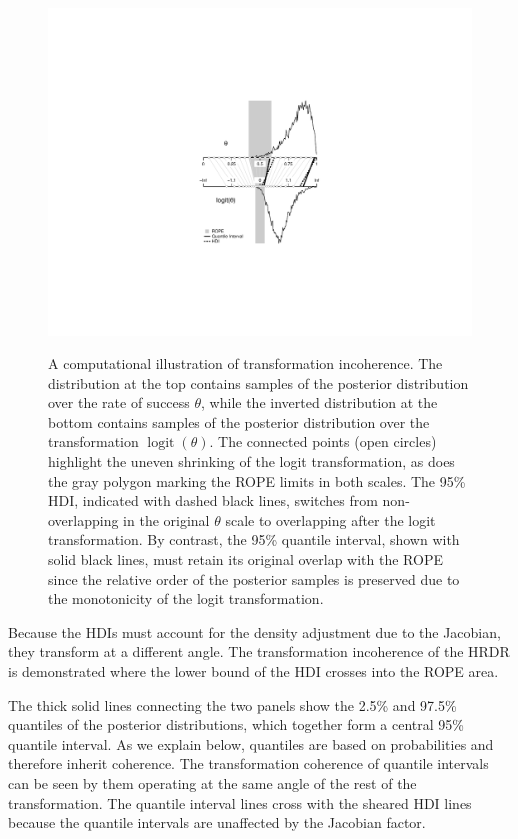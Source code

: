 \documentclass[9pt,twocolumn,twoside]{cidlab-draft}\templatetype{cidlab-invited}
\newcommand{\hdr}{HRDR}
\DeclareMathOperator*{\logit}{logit}
\begin{document}
\begin{figure}
    \centering
    {\includegraphics[bb=285 170 510 450,scale=.9]{p/figure3.pdf}}
    \caption{A computational illustration of transformation incoherence.  The distribution at the top contains samples of the posterior distribution over the rate of success $\theta$, while the inverted distribution at the bottom contains samples of the posterior distribution over the transformation $\logit(\theta)$. The connected points (open circles) highlight the uneven shrinking of the logit transformation, as does the gray polygon marking the ROPE limits in both scales.
    The 95\% HDI, indicated with dashed black lines, switches from non-overlapping in the original $\theta$ scale to overlapping after the logit transformation.
    By contrast, the 95\% quantile interval, shown with solid black lines, must retain its original overlap with the ROPE since the relative order of the posterior samples is preserved due to the monotonicity of the logit transformation.}
    \label{fig:transformation}
\end{figure}

Because the HDIs must account for the density adjustment due to the Jacobian, they transform at a different angle. The transformation incoherence of the \hdr{} is demonstrated where the lower bound of the HDI crosses into the ROPE area. 

The thick solid lines connecting the two panels show the 2.5\% and 97.5\% quantiles of the posterior distributions, which together form a central 95\% quantile interval. As we explain below, quantiles are based on probabilities and therefore inherit coherence. The transformation coherence of quantile intervals can be seen by them operating at the same angle of the rest of the transformation. The quantile interval lines cross with the sheared HDI lines because the quantile intervals are unaffected by the Jacobian factor.
\end{document}
